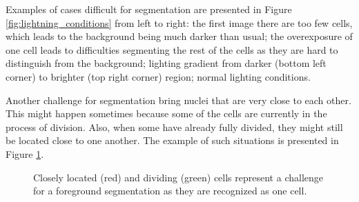 Examples of cases difficult for segmentation are presented in Figure \ref{fig:lightning_conditions} from left to right: the first image there are too few cells, which leads to the background being much darker than usual; the overexposure of one cell leads to difficulties segmenting the rest of the cells as they are hard to distinguish from the background; lighting gradient from darker (bottom left corner) to brighter (top right corner) region; normal lighting conditions.

Another challenge for segmentation bring nuclei that are very close to each other. This might happen sometimes because some of the cells are currently in the process of division. Also, when some have already fully divided, they might still be located close to one another. The example of such situations is presented in Figure \ref{fig:closely-located-cells}.

\begin{figure}[htb]
    \centering
    \qquad
    \caption[Closely located (red) and dividing (green) cells]%
    {Closely located (red) and dividing (green) cells represent a challenge for a foreground segmentation as they are recognized as one cell.}
    \label{fig:closely-located-cells}
\end{figure}

